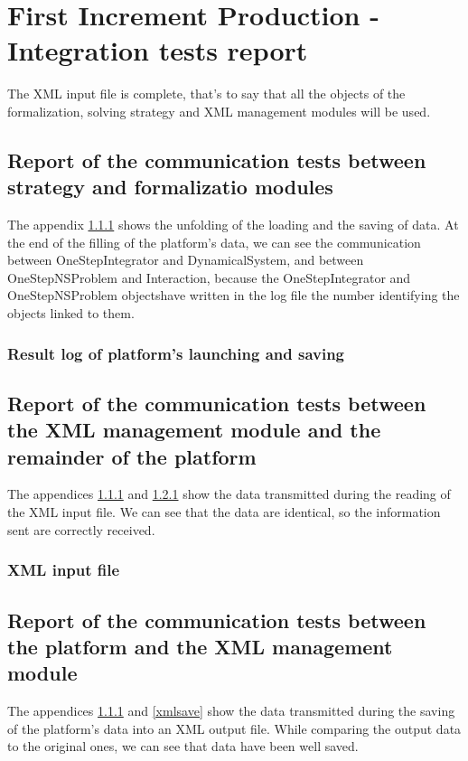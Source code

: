 \section{First Increment Production - Integration tests report}
The XML input file is complete, that's to say that all the objects of the formalization, solving strategy and XML management modules will
be used.

\subsection{Report of the communication tests between strategy and formalizatio modules}
The appendix \ref{siconos} shows the unfolding of the loading and the saving of data. At the end of the filling of the platform's data,
we can see the communication between OneStepIntegrator and DynamicalSystem, and between OneStepNSProblem and Interaction, because the
OneStepIntegrator and OneStepNSProblem objectshave written in the log file the number identifying the objects linked to them.

\subsubsection{Result log of platform's launching and saving}
\label{siconos}


\newpage
\subsection{Report of the communication tests between the XML management module and the remainder of the platform}
The appendices \ref{siconos} and \ref{xmltest} show the data transmitted during the reading of the XML input file. We can see that the
data are identical, so the information sent are correctly received.

\subsubsection{XML input file}
\label{xmltest}


\newpage
\subsection{Report of the communication tests between the platform and the XML management module}
The appendices \ref{siconos} and \ref{xmlsave} show the data transmitted during the saving of the platform's data into an XML output
file. While comparing the output data to the original ones, we can see that data have been well saved.

